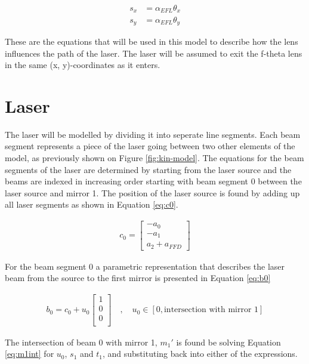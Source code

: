 \begin{align}
    s_x &= \alpha_{EFL} \theta_x \label{eq:f-theta-x} \\
    s_y &= \alpha_{EFL} \theta_y \label{eq:f-theta-y}
\end{align}

These are the equations that will be used in this model to describe how the lens influences the path of the laser. The laser will be assumed to exit the f-theta lens in the same (x, y)-coordinates as it enters.

\section{Laser}

The laser will be modelled by dividing it into seperate line segments. Each beam segment represents a piece of the laser going between two other elements of the model, as previously shown on Figure \ref{fig:kin-model}. The equations for the beam segments of the laser are determined by starting from the laser source and the beams are indexed in increasing order starting with beam segment 0 between the laser source and mirror 1. The position of the laser source is found by adding up all laser segments as shown in Equation \ref{eq:c0}.

\begin{align}
    c_0 =
    \begin{bmatrix}
        -a_0 \\
        -a_1 \\
        a_2 + a_{FFD}
    \end{bmatrix}
    \label{eq:c0}
\end{align}

For the beam segment 0 a parametric representation that describes the laser beam from the source to the first mirror is presented in Equation \ref{eq:b0}

\begin{align}
    b_0 = c_0 + u_0
    \begin{bmatrix}
        1 \\
        0 \\
        0 \\
    \end{bmatrix}
    \quad , \quad
    u_0 \in [0, \text{intersection with mirror 1}]
    \label{eq:b0}
\end{align}

The intersection of beam 0 with mirror 1, $m_1'$ is found be solving Equation \ref{eq:m1int} for $u_0$, $s_1$ and $t_1$, and substituting back into either of the expressions.

